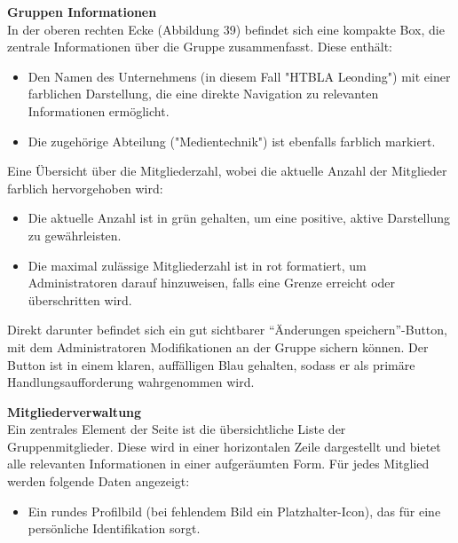 \textbf{Gruppen Informationen}
\\
In der oberen rechten Ecke (Abbildung 39) befindet sich eine kompakte Box, die zentrale Informationen über die Gruppe zusammenfasst. Diese enthält:
\begin{itemize}
    \item Den Namen des Unternehmens (in diesem Fall "HTBLA Leonding") mit einer farblichen Darstellung, die eine direkte Navigation zu relevanten Informationen ermöglicht.
\end{itemize}

\begin{itemize}
    \item Die zugehörige Abteilung ("Medientechnik") ist ebenfalls farblich markiert.
\end{itemize}

Eine Übersicht über die Mitgliederzahl, wobei die aktuelle Anzahl der Mitglieder farblich hervorgehoben wird:
\begin{itemize}
    \item Die aktuelle Anzahl ist in grün gehalten, um eine positive, aktive Darstellung zu gewährleisten.
\end{itemize}

\begin{itemize}
    \item Die maximal zulässige Mitgliederzahl ist in rot formatiert, um Administratoren darauf hinzuweisen, falls eine Grenze erreicht oder überschritten wird.
\end{itemize}

Direkt darunter befindet sich ein gut sichtbarer \textquotedblleft Änderungen speichern\textquotedblright-Button, mit dem Administratoren Modifikationen an der Gruppe sichern können.
Der Button ist in einem klaren, auffälligen Blau gehalten, sodass er als primäre Handlungsaufforderung wahrgenommen wird.


\textbf{Mitgliederverwaltung}
\\
Ein zentrales Element der Seite ist die übersichtliche Liste der Gruppenmitglieder. Diese wird in einer horizontalen Zeile dargestellt und bietet alle relevanten Informationen in einer aufgeräumten Form. Für jedes Mitglied werden folgende Daten angezeigt:

\begin{itemize}
    \item Ein rundes Profilbild (bei fehlendem Bild ein Platzhalter-Icon), das für eine persönliche Identifikation sorgt.
\end{itemize}

